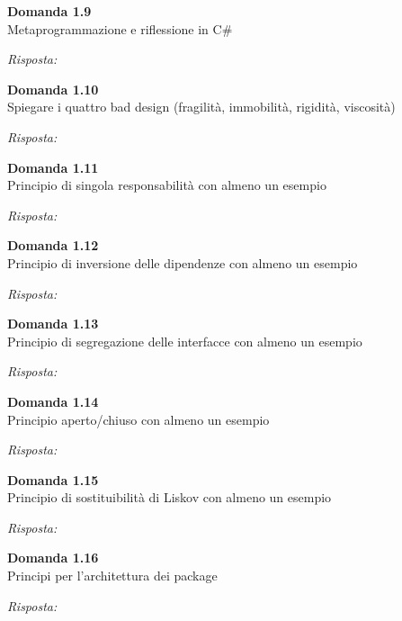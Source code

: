 \documentclass{article}
\newenvironment{problem}[2][Domanda]
    { \begin{mdframed}[backgroundcolor=gray!20] \textbf{#1 #2} \\}
    {  \end{mdframed}}
\newenvironment{solution}
    {\textit{Risposta:}}
    {}
\begin{document}
\begin{problem}{1.9}
Metaprogrammazione e riflessione in C\#
\end{problem}
\begin{solution}
\end{solution}


\begin{problem}{1.10}
Spiegare i quattro bad design (fragilità, immobilità, rigidità, viscosità)
\end{problem}
\begin{solution}
\end{solution}


\begin{problem}{1.11}
Principio di singola responsabilità con almeno un esempio
\end{problem}
\begin{solution}
\end{solution}


\begin{problem}{1.12}
Principio di inversione delle dipendenze con almeno un esempio
\end{problem}
\begin{solution}
\end{solution}


\begin{problem}{1.13}
Principio di segregazione delle interfacce con almeno un esempio
\end{problem}
\begin{solution}
\end{solution}


\begin{problem}{1.14}
Principio aperto/chiuso con almeno un esempio
\end{problem}
\begin{solution}
\end{solution}


\begin{problem}{1.15}
Principio di sostituibilità di Liskov con almeno un esempio
\end{problem}
\begin{solution}
\end{solution}


\begin{problem}{1.16}
Principi per l'architettura dei package
\end{problem}
\begin{solution}
\end{solution}
\end{document}
